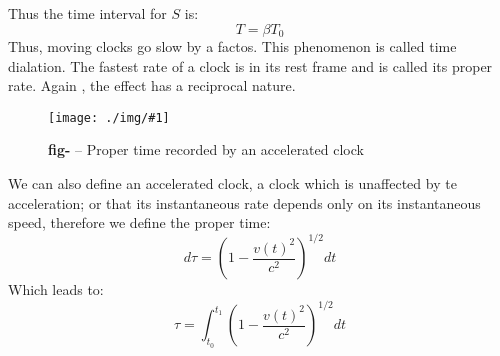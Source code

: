 \documentclass[10pt,a4paper,twocolumn]{article}
\newcounter{def}
\newcounter{figurecounter}
\newcommand{\img}[3]{
    \begin{figure}[h!]
        \centering
        \captionsetup{justification=centering,margin=0cm,labelformat=empty}
        \texttt{[image: ./img/\#1]}
        \label{figure}
        \caption{\small\textbf{fig-\thefigurecounter} -- \textcolor{darkliver}{#3}}
    \end{figure}
    \addtocounter{figurecounter}{1}}
\begin{document}
                Thus the time interval for $S$ is:
                \begin{equation}
                    \boxed{
                        T = \beta T_0
                    }
                \end{equation}
                Thus, moving clocks go slow by a factos. This phenomenon is called time dialation. The fastest rate of a clock is in its rest frame and is called its proper rate. Again , the effect has a reciprocal nature.
                \img{timedialationtwo}{0.8}{Proper time recorded by an accelerated clock}
                We can also define an accelerated clock, a clock which is unaffected by te acceleration; or that its instantaneous rate depends only on its instantaneous speed, therefore we define the proper time:
                \begin{equation}
                    d\tau = \left(1-\frac{v(t)^2}{c^2}\right)^{1/2}dt 
                \end{equation}
                Which leads to:
                \begin{equation}
                    \boxed{
                        \tau = \int_{t_0}^{t_1} \left(1-\frac{v(t)^2}{c^2}\right)^{1/2}dt
                    }
                \end{equation}
\end{document}
